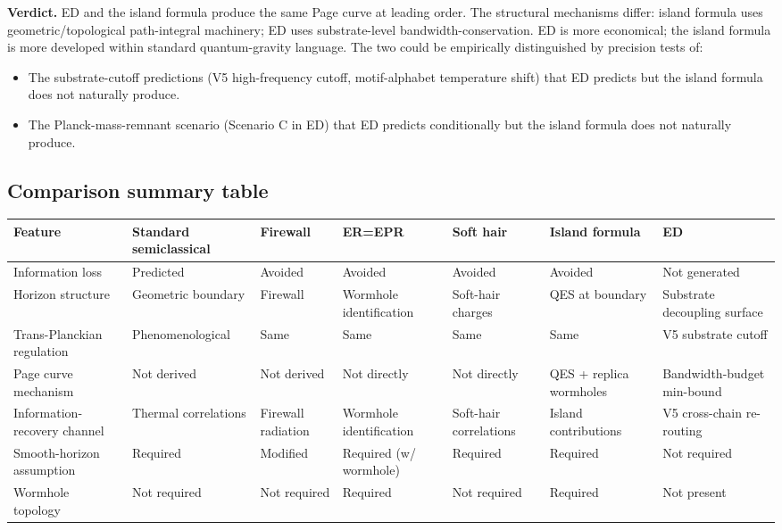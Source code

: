 \documentclass[11pt,a4paper]{article}
\begin{document}
\textbf{Verdict.} ED and the island formula produce the same Page curve at leading order. The structural mechanisms differ: island formula uses geometric/topological path-integral machinery; ED uses substrate-level bandwidth-conservation. ED is more economical; the island formula is more developed within standard quantum-gravity language. The two could be empirically distinguished by precision tests of:
\begin{itemize}[noitemsep]
  \item The substrate-cutoff predictions (V5 high-frequency cutoff, motif-alphabet temperature shift) that ED predicts but the island formula does not naturally produce.
  \item The Planck-mass-remnant scenario (Scenario C in ED) that ED predicts conditionally but the island formula does not naturally produce.
\end{itemize}

\subsection{Comparison summary table}

\begin{center}
\scriptsize
\begin{tabular}{@{}p{2.4cm}p{1.9cm}p{1.7cm}p{1.9cm}p{1.6cm}p{1.7cm}p{2.0cm}@{}}
\toprule
Feature & Standard semiclassical & Firewall & ER=EPR & Soft hair & Island formula & ED \\
\midrule
Information loss & Predicted & Avoided & Avoided & Avoided & Avoided & Not generated \\
Horizon structure & Geometric boundary & Firewall & Wormhole identification & Soft-hair charges & QES at boundary & Substrate decoupling surface \\
Trans-Planckian regulation & Phenomenological & Same & Same & Same & Same & V5 substrate cutoff \\
Page curve mechanism & Not derived & Not derived & Not directly & Not directly & QES + replica wormholes & Bandwidth-budget min-bound \\
Information-recovery channel & Thermal correlations & Firewall radiation & Wormhole identification & Soft-hair correlations & Island contributions & V5 cross-chain re-routing \\
Smooth-horizon assumption & Required & Modified & Required (w/ wormhole) & Required & Required & Not required \\
Wormhole topology & Not required & Not required & Required & Not required & Required & Not present \\
\bottomrule
\end{tabular}
\end{center}
\end{document}
